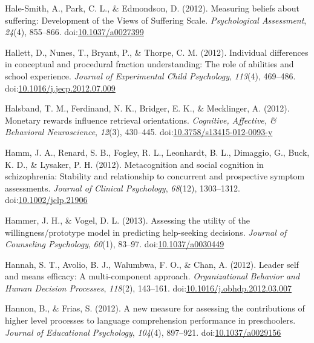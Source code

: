 \documentclass[english,man]{apa6}
\begin{document}
\hypertarget{ref-Hale-Smith2012}{}
Hale-Smith, A., Park, C. L., \& Edmondson, D. (2012). Measuring beliefs
about suffering: Development of the Views of Suffering Scale.
\emph{Psychological Assessment}, \emph{24}(4), 855--866.
doi:\href{https://doi.org/10.1037/a0027399}{10.1037/a0027399}

\hypertarget{ref-Hallett2012}{}
Hallett, D., Nunes, T., Bryant, P., \& Thorpe, C. M. (2012). Individual
differences in conceptual and procedural fraction understanding: The
role of abilities and school experience. \emph{Journal of Experimental
Child Psychology}, \emph{113}(4), 469--486.
doi:\href{https://doi.org/10.1016/j.jecp.2012.07.009}{10.1016/j.jecp.2012.07.009}

\hypertarget{ref-Halsband2012}{}
Halsband, T. M., Ferdinand, N. K., Bridger, E. K., \& Mecklinger, A.
(2012). Monetary rewards influence retrieval orientations.
\emph{Cognitive, Affective, \& Behavioral Neuroscience}, \emph{12}(3),
430--445.
doi:\href{https://doi.org/10.3758/s13415-012-0093-y}{10.3758/s13415-012-0093-y}

\hypertarget{ref-Hamm2012}{}
Hamm, J. A., Renard, S. B., Fogley, R. L., Leonhardt, B. L., Dimaggio,
G., Buck, K. D., \& Lysaker, P. H. (2012). Metacognition and social
cognition in schizophrenia: Stability and relationship to concurrent and
prospective symptom assessments. \emph{Journal of Clinical Psychology},
\emph{68}(12), 1303--1312.
doi:\href{https://doi.org/10.1002/jclp.21906}{10.1002/jclp.21906}

\hypertarget{ref-Hammer2013}{}
Hammer, J. H., \& Vogel, D. L. (2013). Assessing the utility of the
willingness/prototype model in predicting help-seeking decisions.
\emph{Journal of Counseling Psychology}, \emph{60}(1), 83--97.
doi:\href{https://doi.org/10.1037/a0030449}{10.1037/a0030449}

\hypertarget{ref-Hannah2012}{}
Hannah, S. T., Avolio, B. J., Walumbwa, F. O., \& Chan, A. (2012).
Leader self and means efficacy: A multi-component approach.
\emph{Organizational Behavior and Human Decision Processes},
\emph{118}(2), 143--161.
doi:\href{https://doi.org/10.1016/j.obhdp.2012.03.007}{10.1016/j.obhdp.2012.03.007}

\hypertarget{ref-Hannon2012}{}
Hannon, B., \& Frias, S. (2012). A new measure for assessing the
contributions of higher level processes to language comprehension
performance in preschoolers. \emph{Journal of Educational Psychology},
\emph{104}(4), 897--921.
doi:\href{https://doi.org/10.1037/a0029156}{10.1037/a0029156}
\end{document}

